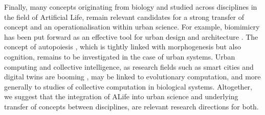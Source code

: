 \documentclass[letterpaper]{article}
\begin{document}
Finally, many concepts originating from biology and studied across disciplines in the field of Artificial Life, remain relevant candidates for a strong transfer of concept and an operationalisation within urban science. For example, biomimicry has been put forward as an effective tool for urban design and architecture \citep{taylor2017art}. The concept of autopoiesis \citep{bourgine2004autopoiesis}, which is tightly linked with morphogenesis but also cognition, remains to be investigated in the case of urban systems. Urban computing and collective intelligence, as research fields such as smart cities and digital twins are booming \citep{batty2018digital}, may be linked to evolutionary computation, and more generally to studies of collective computation in biological systems. Altogether, we suggest that the integration of ALife into urban science and underlying transfer of concepts between disciplines, are relevant research directions for both.




%


\footnotesize

\end{document}
